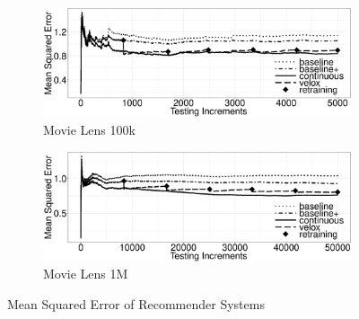 \documentclass[10pt,conference,letterpaper]{IEEEtran}
\begin{document}
\begin{figure}[h]
\begin{subfigure}{\columnwidth}
	\includegraphics[width=\columnwidth]{../images/experiment-results/movie-lens-100k-quality-improved.eps}
	\caption{Movie Lens 100k}
	\label{fig:movie-lens-100k-score}
\end{subfigure}
\begin{subfigure}{\columnwidth}
  \includegraphics[width=\columnwidth]{../images/experiment-results/movie-lens-1m-quality-improved.eps}
\caption{Movie Lens 1M}
\label{fig:movie-lens-1M-score}
\end{subfigure}
\vspace{2mm}
\caption{Mean Squared Error of Recommender Systems}
\end{figure}
\end{document}
